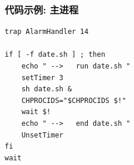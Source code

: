 \documentclass[compress]{beamer}
\begin{document}
\begin{frame}[fragile]
  \frametitle{代码示例: 主进程}

\begin{lstlisting}[firstnumber=last]
trap AlarmHandler 14

if [ -f date.sh ] ; then
    echo " -->   run date.sh "
    setTimer 3
    sh date.sh &
    CHPROCIDS="$CHPROCIDS $!"
    wait $!
    echo " -->   end date.sh "
    UnsetTimer
fi
wait
\end{lstlisting}

\end{frame}
\end{document}
